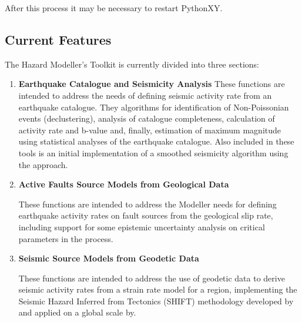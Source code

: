 After this process it may be necessary to restart PythonXY.

\subsection{Current Features}

The Hazard Modeller's Toolkit is currently divided into three sections: 

\begin{enumerate}
\item \textbf{Earthquake Catalogue and Seismicity Analysis}
    These functions are intended to address the needs of defining seismic activity rate from an earthquake catalogue. They algorithms for identification of Non-Poissonian events (declustering), analysis of catalogue completeness, calculation of activity rate and b-value and, finally, estimation of maximum magnitude using statistical analyses of the earthquake catalogue. Also included in these tools is an initial implementation of a smoothed seismicity algorithm using the \cite{frankel1995} approach.
     
\item \textbf{Active Faults Source Models from Geological Data}

    These functions are intended to address the Modeller needs for defining earthquake activity rates on fault sources from the geological slip rate, including support for some epistemic uncertainty analysis on critical parameters in the process.

\item \textbf{Seismic Source Models from Geodetic Data}

    These functions are intended to address the use of geodetic data to derive seismic activity rates from a strain rate model for a region, implementing the Seismic Hazard Inferred from Tectonics (SHIFT) methodology developed by \cite{BirdLiu2007} and applied on a global scale by\cite{Bird_etal2010}.
\end{enumerate}

